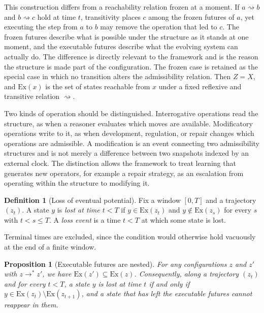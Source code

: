 \documentclass[11pt]{article}
\theoremstyle{definition}
\newtheorem{definition}{Definition}
\theoremstyle{plain}
\newtheorem{proposition}{Proposition}
\theoremstyle{remark}
\newcommand{\reaches}{\rightsquigarrow}
\begin{document}
This construction differs from a reachability relation frozen at a moment. If $a \reaches b$ and $b \reaches c$ hold at time $t$, transitivity places $c$ among the frozen futures of $a$, yet executing the step from $a$ to $b$ may remove the operation that led to $c$. The frozen futures describe what is possible under the structure as it stands at one moment, and the executable futures describe what the evolving system can actually do. The difference is directly relevant to the framework and is the reason the structure is made part of the configuration. The frozen case is retained as the special case in which no transition alters the admissibility relation. Then $Z = X$, and $\mathrm{Ex}(x)$ is the set of states reachable from $x$ under a fixed reflexive and transitive relation $\reaches$.

Two kinds of operation should be distinguished. Interrogative operations read the structure, as when a reasoner evaluates which moves are available. Modificatory operations write to it, as when development, regulation, or repair changes which operations are admissible. A modification is an event connecting two admissibility structures and is not merely a difference between two snapshots indexed by an external clock. The distinction allows the framework to treat learning that generates new operators, for example a repair strategy, as an escalation from operating within the structure to modifying it.

\begin{definition}[Loss of eventual potential]
Fix a window $[0,T]$ and a trajectory $(z_t)$. A state $y$ is \emph{lost at time $t < T$} if $y \in \mathrm{Ex}(z_t)$ and $y \notin \mathrm{Ex}(z_s)$ for every $s$ with $t < s \le T$. A \emph{loss event} is a time $t < T$ at which some state is lost.
\end{definition}

Terminal times are excluded, since the condition would otherwise hold vacuously at the end of a finite window.

\begin{proposition}[Executable futures are nested]
For any configurations $z$ and $z'$ with $z \to^{*} z'$, we have $\mathrm{Ex}(z') \subseteq \mathrm{Ex}(z)$. Consequently, along a trajectory $(z_t)$ and for every $t < T$, a state $y$ is lost at time $t$ if and only if $y \in \mathrm{Ex}(z_t) \setminus \mathrm{Ex}(z_{t+1})$, and a state that has left the executable futures cannot reappear in them.
\end{proposition}
\end{document}
